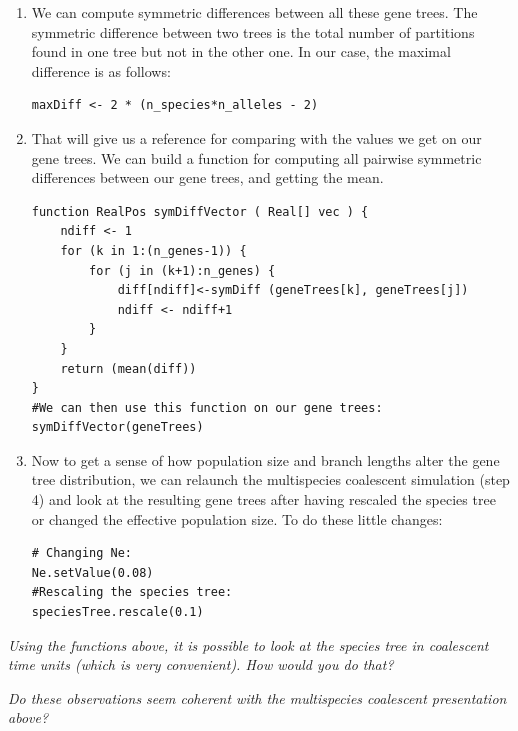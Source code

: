 \documentclass[11pt]{article}
\begin{document}
{\begin{framed}
\begin{enumerate}
{\begin{snugshade*}
\begin{lstlisting}
   # allowing 1 parameter per branch of the species tree, the same line would work.
   geneTrees[i] ~ dnConstPopMultispCoal(speciesTree=speciesTree, Ne=Ne, taxa=taxa)
}
\end{lstlisting}
\end{snugshade*}}
\item We can compute symmetric differences between all these gene trees. The symmetric difference between two trees is the total number of partitions found in one tree but not in the other one. In our case, the maximal difference is as follows:
{\tt \begin{snugshade*}
\begin{lstlisting}
maxDiff <- 2 * (n_species*n_alleles - 2)
\end{lstlisting}
\end{snugshade*}}
\item That will give us a reference for comparing with the values we get on our gene trees. We can build a function for computing all pairwise symmetric differences between our gene trees, and getting the mean.
{\tt \begin{snugshade*}
\begin{lstlisting}
function RealPos symDiffVector ( Real[] vec ) { 
	ndiff <- 1
	for (k in 1:(n_genes-1)) {
		for (j in (k+1):n_genes) {
			diff[ndiff]<-symDiff (geneTrees[k], geneTrees[j]) 
			ndiff <- ndiff+1
		}
	}
	return (mean(diff))
}
#We can then use this function on our gene trees:
symDiffVector(geneTrees)
\end{lstlisting}
\end{snugshade*}}
\item Now to get a sense of how population size and branch lengths alter the gene tree distribution, we can relaunch the multispecies coalescent simulation (step 4) and look at the resulting gene trees after having rescaled the species tree or changed the effective population size. To do these little changes: 
 {\tt \begin{snugshade*}
\begin{lstlisting}
# Changing Ne: 
Ne.setValue(0.08)
#Rescaling the species tree:
speciesTree.rescale(0.1)
\end{lstlisting}
\end{snugshade*}}
\end{enumerate}
\emph{Using the functions above, it is possible to look at the species tree in coalescent time units (which is very convenient). How would you do that?}

\emph{Do these observations seem coherent with the multispecies coalescent presentation above?}
\end{framed}}
\end{document}
